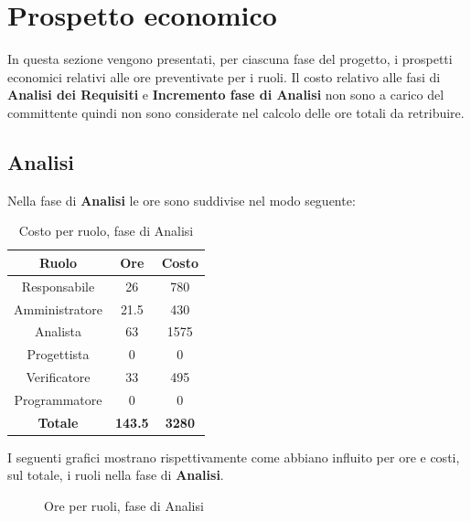 \section{Prospetto economico}
In questa sezione vengono presentati, per ciascuna fase del progetto, i prospetti economici relativi alle ore preventivate per i ruoli. Il costo relativo alle fasi di \textbf{Analisi dei Requisiti} e \textbf{Incremento fase di Analisi} non sono a carico del committente quindi non sono considerate nel calcolo delle ore totali da retribuire.

\subsection{Analisi}
Nella fase di \textbf{Analisi} le ore sono suddivise nel modo seguente:
\begin{table}[H]
  \centering
  \begin{tabular}{|c|c|c|}
  \hline
  \textbf{Ruolo} &
  \textbf{Ore} &
  \textbf{Costo} \\
  \hline
  Responsabile & 26 & 780\\
  \hline
  Amministratore & 21.5 & 430\\
  \hline
  Analista & 63 & 1575\\
  \hline
  Progettista & 0 & 0 \\
  \hline
  Verificatore & 33 & 495\\
  \hline
  Programmatore & 0 & 0 \\
  \hline
   \textbf{Totale} & \textbf{143.5} & \textbf{3280} \\
    \hline
  \end{tabular}
  \caption{Costo per ruolo, fase di Analisi}
\end{table}

I seguenti grafici mostrano rispettivamente come abbiano influito per ore e costi, sul totale, i ruoli nella fase di \textbf{Analisi}.
\begin{figure}[H]
\centering
{}
\caption{Ore per ruoli, fase di Analisi}
\end{figure}

